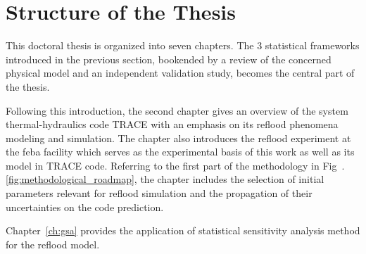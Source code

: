 \section{Structure of the Thesis}\label{sec:intro_thesis_structure}

This doctoral thesis is organized into seven chapters.
The $3$ statistical frameworks introduced in the previous section, 
bookended by a review of the concerned physical model and an independent validation study, 
becomes the central part of the thesis.

Following this introduction, 
the second chapter gives an overview of the system thermal-hydraulics code TRACE with an emphasis on its reflood phenomena modeling and simulation.
The chapter also introduces the reflood experiment at the \gls{feba} facility which serves as the experimental basis of this work
as well as its model in TRACE code.
Referring to the first part of the methodology in Fig~.\ref{fig:methodological_roadmap}, 
the chapter includes the selection of initial parameters relevant for reflood simulation and the propagation of their uncertainties on the code prediction.

Chapter~\ref{ch:gsa} provides the application of statistical sensitivity analysis method for the reflood model.
